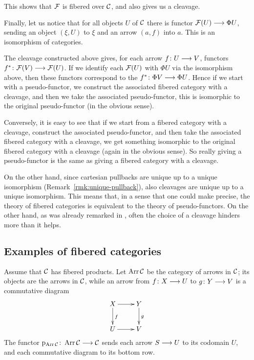 \begin{3   FIBERED CATEGORIES}
\begin{3.1 Fibered categories}
This shows that $\mathcal{F}$ is fibered over $\mathcal{C}$, and also gives us a cleavage.

Finally, let us notice that for all objects $U$ of $\mathcal{C}$ there is functor $\cF(U) \arr \Phi U$, sending an object $(\xi, U)$ to $\xi$ and an arrow $(a, f)$ into $a$. This is an isomorphism of categories.

The cleavage constructed above gives, for each arrow $f \colon U \arr V$, functors $f^* \colon \cF(V) \arr \cF(U)$. If we identify each $\mathcal{F}(U)$ with $\Phi U$ via the isomorphism above, then these functors correspond to the $f^* \colon \Phi V \arr \Phi U$. Hence if we start with a pseudo-functor, we construct the associated fibered category with a cleavage, and then we take the associated pseudo-functor, this is isomorphic to the original pseudo-functor (in the obvious sense).

Conversely, it is easy to see that if we start from a fibered category with a cleavage, construct the associated pseudo-functor, and then take the associated fibered category with a cleavage, we get something isomorphic to the original fibered category with a cleavage (again in the obvious sense). So really giving a pseudo-functor is the same as giving a fibered category with a cleavage.

On the other hand, since cartesian pullbacks are unique up to a unique isomorphism (Remark~\ref{rmk:unique-pullback}), also cleavages are unique up to a unique isomorphism. This means that, in a sense that one could make precise, the theory of fibered categories is equivalent to the theory of pseudo-functors. On the other hand, as was already remarked in \cite[Remarque, pp.~193--194]{sga1}, often the choice of a cleavage hinders more than it helps.

\end{3.1 Fibered categories}
\begin{3.2 Examples of fibered categories}
\setcounter{section}{1}
\section{Examples of fibered categories}\label{sec:examples-fibered}
\setcounter{theorem}{14}
\begin{example}\label{ex:arrows} Assume that $\mathcal{C}$ has fibered products. Let $\operatorname{Arr} \mathcal{C}$ be the category of arrows in $\mathcal{C}$; its objects are the arrows in $\mathcal{C}$, while an arrow from $f\colon X \arr U$ to $g \colon Y \arr V$ is a commutative diagram
   \[
   \xymatrix{
   X\ar[r] \ar[d]^f & Y \ar[d]^g\\
   U\ar[r] & V
   }
   \]
The functor $\p_{\Arr \cC}\colon \Arr \cC\arr \cC$ sends each arrow $S \arr U$ to its codomain $U$, and each commutative diagram to its bottom row.


\end{example}
\end{3.2 Examples of fibered categories}
\end{3   FIBERED CATEGORIES}
